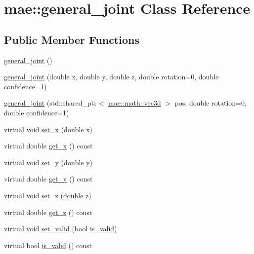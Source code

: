 \hypertarget{classmae_1_1general__joint}{\section{mae\-:\-:general\-\_\-joint Class Reference}
\label{classmae_1_1general__joint}
}
\subsection*{Public Member Functions}
\begin{DoxyCompactItemize}
\item 
\hyperlink{classmae_1_1general__joint_ac9c50beac0204b353586b6d81aa18892}{general\-\_\-joint} ()
\item 
\hyperlink{classmae_1_1general__joint_a262aad316ffaf79cadcd3abdc5b312f1}{general\-\_\-joint} (double x, double y, double z, double rotation=0, double confidence=1)
\item 
\hyperlink{classmae_1_1general__joint_aba0cbdf8e6615d7a9202ed39fca8bb8b}{general\-\_\-joint} (std\-::shared\-\_\-ptr$<$ \hyperlink{classmae_1_1math_1_1vec3d}{mae\-::math\-::vec3d} $>$ pos, double rotation=0, double confidence=1)
\item 
virtual void \hyperlink{classmae_1_1general__joint_a43a5145b63422de7e4ef4779e560a31e}{set\-\_\-x} (double x)
\item 
virtual double \hyperlink{classmae_1_1general__joint_ad15be52c24de78779e75670374809d5f}{get\-\_\-x} () const 
\item 
virtual void \hyperlink{classmae_1_1general__joint_a1065a2f52851c83cda817756c4314c6e}{set\-\_\-y} (double y)
\item 
virtual double \hyperlink{classmae_1_1general__joint_a0520313b899475a54dd57af53b773b88}{get\-\_\-y} () const 
\item 
virtual void \hyperlink{classmae_1_1general__joint_a6d2b2d3bf157134ceb5a4a6091141730}{set\-\_\-z} (double z)
\item 
virtual double \hyperlink{classmae_1_1general__joint_a7b66432f7292a5c6a81505f43eaa8234}{get\-\_\-z} () const 
\item 
virtual void \hyperlink{classmae_1_1general__joint_a4872e4788d658e01d79037b538c62bc0}{set\-\_\-valid} (bool \hyperlink{classmae_1_1general__joint_a624546b62488b6aa69460f59bf38a711}{is\-\_\-valid})
\item 
virtual bool \hyperlink{classmae_1_1general__joint_a624546b62488b6aa69460f59bf38a711}{is\-\_\-valid} () const 
\item 

\end{DoxyCompactItemize}
